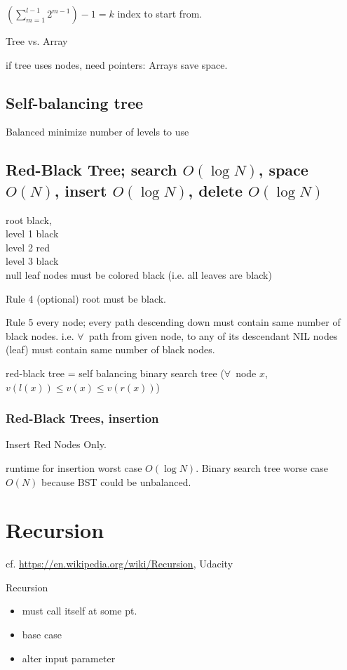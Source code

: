 \documentclass[10pt]{amsart}
\begin{document}
$\left(\sum_{m=1}^{l-1} 2^{m-1} \right) - 1 = k$ index to start from. 

Tree vs. Array

if tree uses nodes, need pointers: Arrays save space. 

\subsection{Self-balancing tree}

Balanced minimize number of levels to use

\subsection{Red-Black Tree; search $O(\log{N})$, space $O(N)$, insert $O(\log{N})$, delete $O(\log{N})$ }

root black, \\
level 1 black \\
level 2 red \\
level 3 black \\

null leaf nodes must be colored black (i.e. all leaves are black)

Rule 4 (optional) root must be black.

Rule 5 every node; every path descending down must contain same number of black nodes. i.e. $\forall\, $ path from given node, to any of its descendant NIL nodes (leaf) must contain same number of black nodes. 

red-black tree = self balancing binary search tree ($\forall \, $ node $x$, $v(l(x)) \leq v(x) \leq v(r(x))$)

\subsubsection{Red-Black Trees, insertion}

Insert Red Nodes Only. 

runtime for insertion worst case $O(\log{N})$. Binary search tree worse case $O(N)$ because BST could be unbalanced. 




\section{Recursion}

cf. \url{https://en.wikipedia.org/wiki/Recursion},  Udacity 

Recursion
\begin{itemize}
	\item must call itself at some pt.
	\item base case
	\item alter input parameter
\end{itemize}
\end{document}
